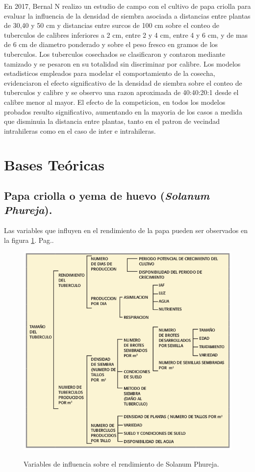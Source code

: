 En 2017, Bernal N realizo un estudio de campo con el cultivo de papa criolla para evaluar la influencia de la densidad de siembra asociada a distancias entre plantas de 30,40 y 50 cm y distancias entre surcos de 100 cm sobre el conteo de tuberculos de calibres inferiores a 2 cm, entre 2 y 4 cm, entre 4 y 6 cm, y de mas de 6 cm de diametro ponderado y sobre el peso fresco en gramos de los tuberculos. Los tuberculos cosechados se clasificaron y contaron mediante tamizado y se pesaron en su totalidad sin discriminar por calibre. Los modelos estadisticos empleados para modelar el comportamiento de la cosecha, evidenciaron el efecto significativo de la densidad de siembra sobre el conteo de tuberculos y calibre y se observo una razon aproximada de 40:40:20:1 desde el calibre menor al mayor. El efecto de la competicion, en todos los modelos probados resulto significativo, aumentando en la mayoria de los casos a medida que disminuia la distancia entre plantas, tanto en el patron de vecindad intrahileras como en el caso de inter e intrahileras.

\section{Bases Te\'oricas}

\subsection{Papa criolla o yema de huevo (\textit{Solanum Phureja}).}

Las variables que influyen en el rendimiento de la papa pueden ser observados en la figura \ref{fig:arch}. Pag.\pageref{fig:arch}.\\
\begin{figure}[h]
	\caption{Variables de influencia sobre el rendimiento de Solanum Phureja.}
	\centering
	\includegraphics[scale=0.5]{variables.png}
	\label{fig:arch}
\end{figure}

